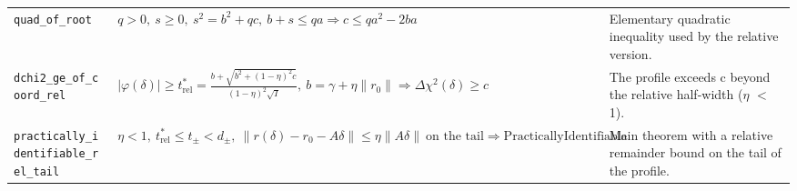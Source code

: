 {\begin{longtable}{@{}>{\raggedright\arraybackslash}p{3.6cm}>{\raggedright\arraybackslash}p{6.6cm}>{\raggedright\arraybackslash}p{5.6cm}@{}}
\texttt{quad\_\allowbreak{}of\_\allowbreak{}root} & $\displaystyle q>0,\ s\ge0,\ s^2=b^2+qc,\ b+s\le qa\Rightarrow c\le qa^2-2ba$ & Elementary quadratic inequality used by the relative version. \\[3pt]
\texttt{dchi2\_\allowbreak{}ge\_\allowbreak{}of\_\allowbreak{}coord\_\allowbreak{}rel} & $\displaystyle |\varphi(\delta)|\ge t^{\ast}_{\mathrm{rel}}=\frac{b+\sqrt{b^2+(1-\eta)^2c}}{(1-\eta)^2\sqrt I},\ b=\gamma+\eta\|r_0\|\Rightarrow\Delta\chi^2(\delta)\ge c$ & The profile exceeds c beyond the relative half-width ($\eta$ $<$ 1). \\[3pt]
\texttt{practically\_\allowbreak{}identifiable\_\allowbreak{}rel\_\allowbreak{}tail} & $\displaystyle \eta<1,\ t^{\ast}_{\mathrm{rel}}\le t_\pm<d_\pm,\ \|r(\delta)-r_0-A\delta\|\le\eta\|A\delta\|\ \text{on the tail}\Rightarrow\mathrm{PracticallyIdentifiable}$ & Main theorem with a relative remainder bound on the tail of the profile. \\[3pt]
\bottomrule
\end{longtable}
}

